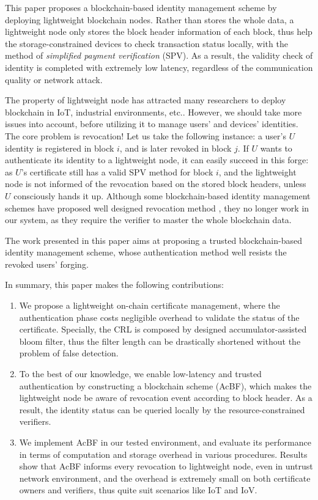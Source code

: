 \documentclass[conference]{IEEEtran}
\begin{document}
This paper proposes a blockchain-based identity management scheme by deploying lightweight blockchain nodes. Rather than stores the whole data, a lightweight node only stores the block header information of each block, thus help the storage-constrained devices to check transaction status locally, with the method of \textit{simplified payment verification} (SPV). As a result, the validity check of identity is completed with extremely low latency, regardless of the communication quality or network attack. 

The property of lightweight node has attracted many researchers to deploy blockchain in IoT, industrial environments, etc.. However, we should take more issues into account, before utilizing it to manage users' and devices' identities. The core problem is revocation! Let us take the following instance: a user's $U$ identity is registered in block $i$, and is later revoked in block $j$. If $U$ wants to authenticate its identity to a lightweight node, it can easily succeed in this forge: as $U$'s certificate still has a valid SPV method for block $i$, and the lightweight node is not informed of the revocation based on the stored block headers, unless $U$ consciously hands it up. Although some blockchain-based identity management schemes have proposed well designed revocation method \cite{luoScalaCertScalabilityOrientedPKI2022a, xchameleon, accumulator, bloom}, they no longer work in our system, as they require the verifier to master the whole blockchain data. 

The work presented in this paper aims at proposing a trusted blockchain-based identity management scheme, whose authentication method well resists the revoked users' forging. 

In summary, this paper makes the following contributions:
\begin{enumerate}
	\item We propose a lightweight on-chain certificate management, where the authentication phase costs negligible overhead to validate the status of the certificate. Specially, the CRL is composed by designed accumulator-assisted bloom filter, thus the filter length can be drastically shortened without the problem of false detection. 
	\item To the best of our knowledge, we enable low-latency and trusted authentication by constructing a blockchain scheme (AcBF), which makes the lightweight node be aware of revocation event according to block header. As a result, the identity status can be queried locally by the resource-constrained verifiers.
	\item We implement AcBF in our tested environment, and evaluate its performance in terms of computation and storage overhead in various procedures. Results show that AcBF informs every revocation to lightweight node, even in untrust network environment, and the overhead is extremely small on both certificate owners and verifiers, thus quite suit scenarios like IoT and IoV.
\end{enumerate}
\end{document}
